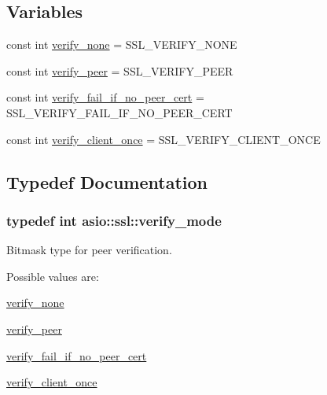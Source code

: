 \subsection*{Variables}
\begin{DoxyCompactItemize}
\item 
const int \hyperlink{namespaceasio_1_1ssl_a4b2056fdb330248b703c81a5458053cd}{verify\+\_\+none} = S\+S\+L\+\_\+\+V\+E\+R\+I\+F\+Y\+\_\+\+N\+O\+N\+E
\item 
const int \hyperlink{namespaceasio_1_1ssl_ae71141f1eff86b35a2a2491501d55926}{verify\+\_\+peer} = S\+S\+L\+\_\+\+V\+E\+R\+I\+F\+Y\+\_\+\+P\+E\+E\+R
\item 
const int \hyperlink{namespaceasio_1_1ssl_a7f69308747090e59be95a6c9b2497eb5}{verify\+\_\+fail\+\_\+if\+\_\+no\+\_\+peer\+\_\+cert} = S\+S\+L\+\_\+\+V\+E\+R\+I\+F\+Y\+\_\+\+F\+A\+I\+L\+\_\+\+I\+F\+\_\+\+N\+O\+\_\+\+P\+E\+E\+R\+\_\+\+C\+E\+R\+T
\item 
const int \hyperlink{namespaceasio_1_1ssl_af9dfada7a85d6a5bfb257eb5ad280ce7}{verify\+\_\+client\+\_\+once} = S\+S\+L\+\_\+\+V\+E\+R\+I\+F\+Y\+\_\+\+C\+L\+I\+E\+N\+T\+\_\+\+O\+N\+C\+E
\end{DoxyCompactItemize}


\subsection{Typedef Documentation}
\hypertarget{namespaceasio_1_1ssl_aa6497e51bc608f2397a731a14f80b563}{}
\subsubsection[{verify\+\_\+mode}]{\setlength{\rightskip}{0pt plus 5cm}typedef int {\bf asio\+::ssl\+::verify\+\_\+mode}}\label{namespaceasio_1_1ssl_aa6497e51bc608f2397a731a14f80b563}


Bitmask type for peer verification. 

Possible values are\+:

\begin{DoxyItemize}
\item \hyperlink{namespaceasio_1_1ssl_a4b2056fdb330248b703c81a5458053cd}{verify\+\_\+none} \item \hyperlink{namespaceasio_1_1ssl_ae71141f1eff86b35a2a2491501d55926}{verify\+\_\+peer} \item \hyperlink{namespaceasio_1_1ssl_a7f69308747090e59be95a6c9b2497eb5}{verify\+\_\+fail\+\_\+if\+\_\+no\+\_\+peer\+\_\+cert} \item \hyperlink{namespaceasio_1_1ssl_af9dfada7a85d6a5bfb257eb5ad280ce7}{verify\+\_\+client\+\_\+once} \end{DoxyItemize}


